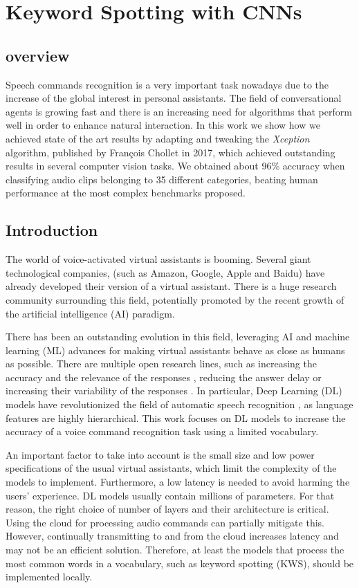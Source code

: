 \chapter{Keyword Spotting with CNNs} \label{ch:kws}

\section{overview}
Speech commands recognition is a very important task nowadays due to the increase of the global interest in personal assistants. The field of conversational agents is growing fast and there is an increasing need for algorithms that perform well in order to enhance natural interaction. In this work we show how we achieved state of the art results by adapting and tweaking the \textit{Xception} algorithm, published by François Chollet in 2017, which achieved outstanding results in several computer vision tasks. We obtained about 96\% accuracy when classifying audio clips belonging to 35 different categories, beating human performance at the most complex benchmarks proposed.


\section{Introduction}
The world of voice-activated virtual assistants is booming. Several giant technological companies, (such as Amazon, Google, Apple and Baidu) have already developed their version of a virtual assistant. There is a huge research community surrounding this field, potentially promoted by the recent growth of the artificial intelligence (AI) paradigm. 

There has been an outstanding evolution in this field, leveraging AI and machine learning (ML) advances for  making virtual assistants behave as close as humans as possible. There are multiple open research lines, such as increasing the accuracy and the relevance of the responses \cite{milabot2017}, reducing the answer delay \cite{Han2017} or increasing their variability of the responses \cite{Li2017}. In particular, Deep Learning (DL) models have revolutionized the field of automatic speech recognition \cite{Nassif2019}, as language features are highly hierarchical. This work focuses on DL models to increase the accuracy of a voice command recognition task using a limited vocabulary. 

An important factor to take into account is the small size and low power specifications of the usual virtual assistants, which limit the complexity of the models to implement. Furthermore, a low latency is needed to avoid harming the users' experience. DL models usually contain millions of parameters. For that reason, the right choice of number of layers and their architecture is critical. Using the cloud for processing audio commands can partially mitigate this. However, continually transmitting to and from the cloud increases latency and may not be an efficient solution. Therefore, at least the models that process the most common words in a vocabulary, such as keyword spotting (KWS), should be implemented locally.

